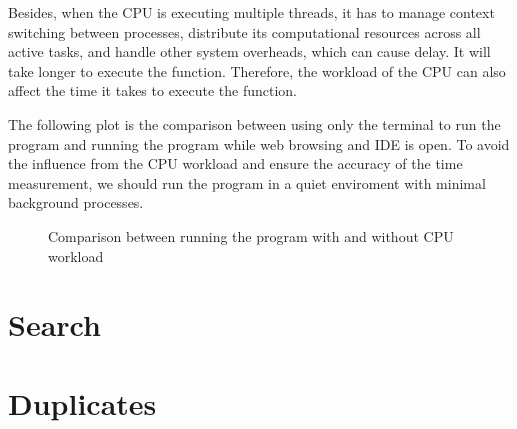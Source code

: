 \documentclass[a4paper,11pt]{article}
\begin{document}
Besides, when the CPU is executing multiple threads, it has to manage context switching between processes, 
distribute its computational resources across all active tasks, and handle other system overheads, which can cause delay.
It will take longer to execute the function. Therefore, the workload of the CPU can also affect the time it takes to 
execute the function.

The following plot is the comparison between using only the terminal to run the program and running the program while 
web browsing and IDE is open. To avoid the influence from the CPU workload and ensure the accuracy of the 
time measurement, we should run the program in a quiet enviroment with minimal background processes.


\begin{figure}[h]
    \centering
    \caption{Comparison between running the program with and without CPU workload}
    \label{fig:clock_accuracy_busy}
\end{figure}

\section*{Search}

\section*{Duplicates}
\end{document}
